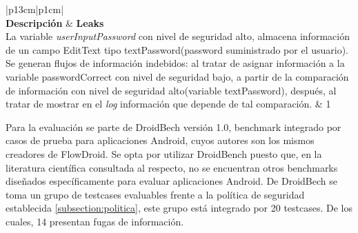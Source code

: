 \begin{table}[t]
\begin{tabular}{|p{13cm}|p{1cm}|}
	\hline
	\\
	\hline
	\textbf{Descripción} & \textbf{Leaks}\\
	\hline
	 La variable \textit{userInputPassword} con nivel de seguridad alto, almacena
	 información de un campo EditText tipo textPassword(password suministrado por
	 el usuario). Se generan flujos de información indebidos: al tratar de asignar
	 información a la variable passwordCorrect con nivel de seguridad bajo, a
	 partir de la comparación de información con nivel de seguridad alto(variable
	 textPassword), después, al tratar de mostrar en el \textit{log} información
	 que depende de tal comparación. & 1\\
	\hline
\end{tabular}
\caption{Aplicaciones de prueba.\newline
Describe parte del conjunto de aplicaciones de prueba. 
}
\label{tab:descripApps0}
\end{table}

Para la evaluación se parte de DroidBech versión 1.0\cite{DroidBenchBenchmarks},
benchmark integrado por casos de prueba para aplicaciones Android, cuyos
autores son los mismos creadores de FlowDroid. Se opta por
utilizar DroidBench puesto que, en la literatura científica consultada al respecto, no se encuentran
otros benchmarks diseñados específicamente para evaluar aplicaciones Android.\newline 
De DroidBech se toma un grupo de testcases evaluables frente a la política de
seguridad establecida \ref{subsection:politica}, este grupo está integrado por
20 testcases. De los cuales, 14 presentan fugas de información.

